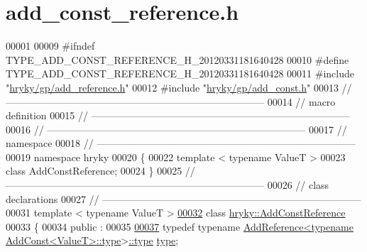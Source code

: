 \hypertarget{add__const__reference_8h_source}{\section{add\-\_\-const\-\_\-reference.\-h}
}

\begin{DoxyCode}
00001 
00009 \textcolor{preprocessor}{#ifndef TYPE\_ADD\_CONST\_REFERENCE\_H\_20120331181640428}
00010 \textcolor{preprocessor}{}\textcolor{preprocessor}{#define TYPE\_ADD\_CONST\_REFERENCE\_H\_20120331181640428}
00011 \textcolor{preprocessor}{}\textcolor{preprocessor}{#include "\hyperlink{add__reference_8h}{hryky/gp/add_reference.h}"}
00012 \textcolor{preprocessor}{#include "\hyperlink{add__const_8h}{hryky/gp/add_const.h}"}
00013 \textcolor{comment}{//
      ------------------------------------------------------------------------------}
00014 \textcolor{comment}{// macro definition}
00015 \textcolor{comment}{//
      ------------------------------------------------------------------------------}
00016 \textcolor{comment}{//
      ------------------------------------------------------------------------------}
00017 \textcolor{comment}{// namespace}
00018 \textcolor{comment}{//
      ------------------------------------------------------------------------------}
00019 \textcolor{keyword}{namespace }hryky
00020 \{
00022     \textcolor{keyword}{template} < \textcolor{keyword}{typename} ValueT >
00023     \textcolor{keyword}{class }AddConstReference;
00024 \}
00025 \textcolor{comment}{//
      ------------------------------------------------------------------------------}
00026 \textcolor{comment}{// class declarations}
00027 \textcolor{comment}{//
      ------------------------------------------------------------------------------}
00031 \textcolor{comment}{}\textcolor{keyword}{template} < \textcolor{keyword}{typename} ValueT >
\hypertarget{add__const__reference_8h_source_l00032}{}\hyperlink{classhryky_1_1_add_const_reference}{00032} \textcolor{keyword}{class }\hyperlink{classhryky_1_1_add_const_reference}{hryky::AddConstReference}
00033 \{
00034 \textcolor{keyword}{public} :
00035 
\hypertarget{add__const__reference_8h_source_l00037}{}\hyperlink{classhryky_1_1_add_const_reference_aa26e39e87462673d865c90e6a9798b5a}{00037}     \textcolor{keyword}{typedef} \textcolor{keyword}{typename} \hyperlink{classhryky_1_1_add_reference}{AddReference<typename AddConst<ValueT>::type}>\hyperlink{classhryky_1_1_add_const_reference_aa26e39e87462673d865c90e6a9798b5a}{::type} \hyperlink{classhryky_1_1_add_const_reference_aa26e39e87462673d865c90e6a9798b5a}{type};

\end{DoxyCode}
